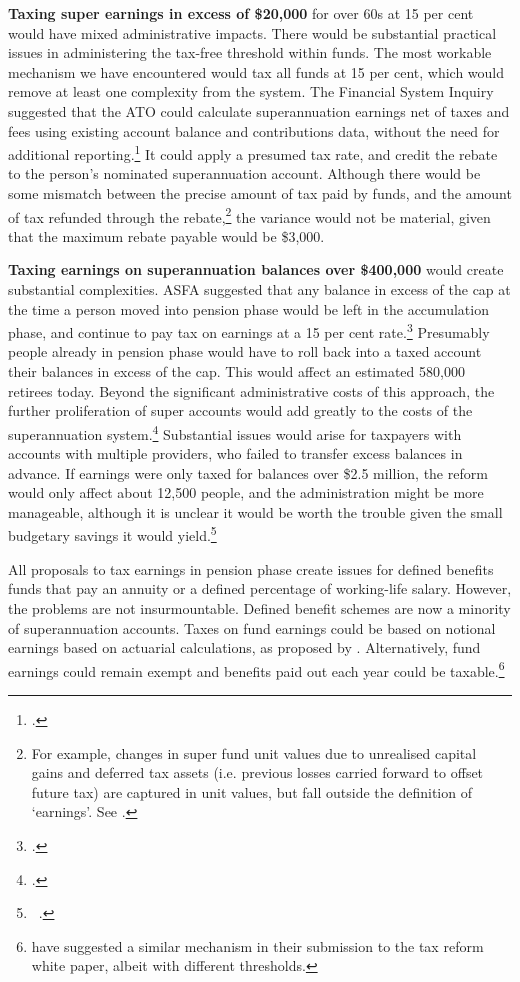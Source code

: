\documentclass{grattanAlpha}
\begin{document}
\textbf{Taxing super earnings in excess of \$20,000} for over 60s at 15 per cent would have mixed administrative impacts. There would be substantial practical issues in administering the tax-free threshold within funds. The most workable mechanism we have encountered would tax all funds at 15 per cent, which would remove at least one complexity from the system. The Financial System Inquiry suggested that the ATO could calculate superannuation earnings net of taxes and fees using existing account balance and contributions data, without the need for additional reporting.\footcite[][141]{FinancialSystemsInquiry2015}  It could apply a presumed tax rate, and credit the rebate to the person’s nominated superannuation account. Although there would be some mismatch between the precise amount of tax paid by funds, and the amount of tax refunded through the rebate,\footnote{For example, changes in super fund unit values due to unrealised capital gains and deferred tax assets (i.e. previous losses carried forward to offset future tax) are captured in unit values, but fall outside the definition of ‘earnings’. See \textcite[][26]{FinancialSystemsInquiry2015}.}  the variance would not be material, given that the maximum rebate payable would be \$3,000.

\textbf{Taxing earnings on superannuation balances over \$400,000} would create substantial complexities. ASFA suggested that any balance in excess of the cap at the time a person moved into pension phase would be left in the accumulation phase, and continue to pay tax on earnings at a 15 per cent rate.\footcite[][18]{ASFA2015TreasurySubmission}  Presumably people already in pension phase would have to roll back into a taxed account their balances in excess of the cap. This would affect an estimated 580,000 retirees today. Beyond the significant administrative costs of this approach, the further proliferation of super accounts would add greatly to the costs of the superannuation system.\footcite[][13]{MinifieSavageCameron2015}  Substantial issues would arise for taxpayers with accounts with multiple providers, who failed to transfer excess balances in advance. If earnings were only taxed for balances over \$2.5 million, the reform would only affect about 12,500 people, and the administration might be more manageable, although it is unclear it would be worth the trouble given the small budgetary savings it would yield.\footnote{\gao\ \textcite{ABS2013t}.}

All proposals to tax earnings in pension phase create issues for defined benefits funds that pay an annuity or a defined percentage of working-life salary. However, the problems are not insurmountable. Defined benefit schemes are now a minority of superannuation accounts. Taxes on fund earnings could be based on notional earnings based on actuarial calculations, as proposed by \textcite{SwanShorten2013}. Alternatively, fund earnings could remain exempt and benefits paid out each year could be taxable.\footnote{\textcite{ASFA2015TreasurySubmission} have suggested a similar mechanism in their submission to the tax reform white paper, albeit with different thresholds.}
\end{document}
